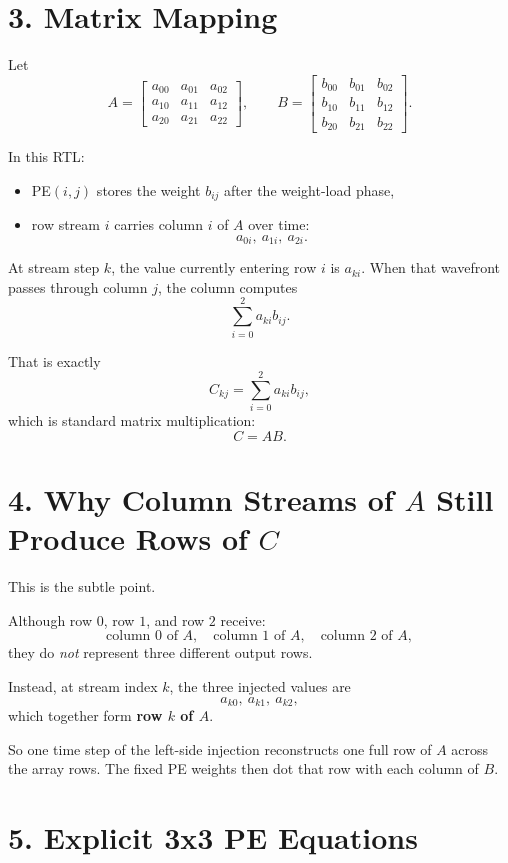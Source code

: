 \documentclass[11pt]{article}
\begin{document}
\section*{3. Matrix Mapping}

Let
\[
A =
\begin{bmatrix}
a_{00} & a_{01} & a_{02} \\
a_{10} & a_{11} & a_{12} \\
a_{20} & a_{21} & a_{22}
\end{bmatrix},
\qquad
B =
\begin{bmatrix}
b_{00} & b_{01} & b_{02} \\
b_{10} & b_{11} & b_{12} \\
b_{20} & b_{21} & b_{22}
\end{bmatrix}.
\]

In this RTL:
\begin{itemize}
    \item PE$(i,j)$ stores the weight $b_{ij}$ after the weight-load phase,
    \item row stream $i$ carries column $i$ of $A$ over time:
    \[
    a_{0i},\ a_{1i},\ a_{2i}.
    \]
\end{itemize}

At stream step $k$, the value currently entering row $i$ is $a_{ki}$. When that wavefront passes through column $j$, the column computes
\[
\sum_{i=0}^{2} a_{ki} b_{ij}.
\]

That is exactly
\[
C_{kj} = \sum_{i=0}^{2} a_{ki} b_{ij},
\]
which is standard matrix multiplication:
\[
C = AB.
\]

\section*{4. Why Column Streams of $A$ Still Produce Rows of $C$}

This is the subtle point.

Although row $0$, row $1$, and row $2$ receive:
\[
\text{column 0 of } A,\quad \text{column 1 of } A,\quad \text{column 2 of } A,
\]
they do \emph{not} represent three different output rows.

Instead, at stream index $k$, the three injected values are
\[
a_{k0},\ a_{k1},\ a_{k2},
\]
which together form \textbf{row $k$ of $A$}.

So one time step of the left-side injection reconstructs one full row of $A$ across the array rows. The fixed PE weights then dot that row with each column of $B$.

\section*{5. Explicit 3x3 PE Equations}
\end{document}
